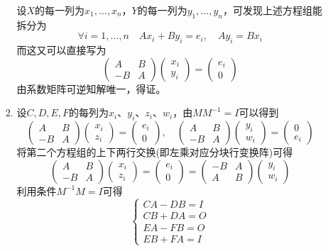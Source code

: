 \documentclass[a4paper,UTF8,fontset=windows]{ctexart}
\begin{document}
\begin{enumerate}
\begin{enumerate}
\begin{enumerate}
            设$X$的每一列为$x_1,\dots,x_n$，$Y$的每一列为$y_1,\dots,y_n$，可发现上述方程组能拆分为
            $$\forall i=1,\dots,n\quad Ax_i+By_i=e_i,\quad Ay_i=Bx_i$$
            而这又可以直接写为
            $$\begin{pmatrix}A&B\\-B&A\end{pmatrix}\begin{pmatrix}x_i\\y_i\end{pmatrix}=\begin{pmatrix}e_i\\0\end{pmatrix}$$
            由系数矩阵可逆知解唯一，得证。

            \item 设$C,D,E,F$的每列为$x_i$、$y_i$、$z_i$、$w_i$，由$MM^{-1}=I$可以得到
            $$\begin{pmatrix}A&B\\-B&A\end{pmatrix}\begin{pmatrix}x_i\\z_i\end{pmatrix}=\begin{pmatrix}e_i\\0\end{pmatrix},\quad\begin{pmatrix}A&B\\-B&A\end{pmatrix}\begin{pmatrix}y_i\\w_i\end{pmatrix}=\begin{pmatrix}0\\e_i\end{pmatrix}$$
            将第二个方程组的上下两行交换(即左乘对应分块行变换阵)可得
            $$\begin{pmatrix}A&B\\-B&A\end{pmatrix}\begin{pmatrix}x_i\\z_i\end{pmatrix}=\begin{pmatrix}e_i\\0\end{pmatrix}=\begin{pmatrix}-B&A\\A&B\end{pmatrix}\begin{pmatrix}y_i\\w_i\end{pmatrix}$$
            利用条件$M^{-1}M=I$可得
            $$\begin{cases}CA-DB=I\\CB+DA=O\\EA-FB=O\\EB+FA=I\end{cases}$$


\end{enumerate}
\end{enumerate}
\end{enumerate}
\end{document}
